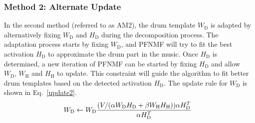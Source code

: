 \documentclass{article}
\begin{document}

\subsubsection{Method 2: Alternate Update}\label{subsubsec:method2}
In the second method (referred to as AM2), the drum template $W_\mathrm{D}$ is adapted by alternatively fixing $W_\mathrm{D}$ and $H_\mathrm{D}$ during the decomposition process. The adaptation process starts by fixing $W_\mathrm{D}$, and PFNMF will try to fit the best activation $H_\mathrm{D}$ to approximate the drum part in the music. Once $H_\mathrm{D}$ is determined, a new iteration of PFNMF can be started by fixing $H_\mathrm{D}$ and allow $W_\mathrm{D}$, $W_\mathrm{H}$ and $H_\mathrm{H}$ to update. This constraint will guide the algorithm to fit better drum templates based on the detected activation $H_\mathrm{D}$. The update rule for $W_\mathrm{D}$ is shown in Eq.~\eqref{update2}. 
%
\begin{equation}\label{update2}
W_\mathrm{D} \leftarrow W_\mathrm{D}\frac{(V/(\alpha W_\mathrm{D}H_\mathrm{D} + \beta W_\mathrm{H}H_\mathrm{H})) \alpha H_\mathrm{D}^T}{\alpha H_\mathrm{D}^T}\\
\end{equation}

\end{document}
